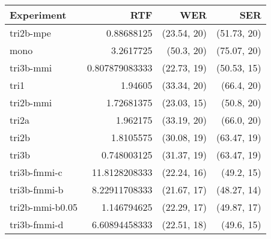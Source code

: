 \begin{table}[!htp]\label{tab:best_nooov}\centering\begin{tabular}{l|rrr}
Experiment      & \ac{RTF}       & \ac{WER}         & \ac{SER} \\
\hline
tri2b-mpe       & 0.88688125     & (23.54, 20) & (51.73, 20)\\
mono            & 3.2617725      & (50.3, 20)  & (75.07, 20)\\
tri3b-mmi       & 0.807879083333 & (22.73, 19) & (50.53, 15)\\
tri1            & 1.94605        & (33.34, 20) & (66.4, 20) \\
tri2b-mmi       & 1.72681375     & (23.03, 15) & (50.8, 20) \\
tri2a           & 1.962175       & (33.19, 20) & (66.0, 20) \\
tri2b           & 1.8105575      & (30.08, 19) & (63.47, 19)\\
tri3b           & 0.748003125    & (31.37, 19) & (63.47, 19)\\
tri3b-fmmi-c    & 11.8128208333  & (22.24, 16) & (49.2, 15) \\
tri3b-fmmi-b    & 8.22911708333  & (21.67, 17) & (48.27, 14)\\
tri2b-mmi-b0.05 & 1.146794625    & (22.29, 17) & (49.87, 17)\\
tri3b-fmmi-d    & 6.60894458333  & (22.51, 18) & (49.6, 15)
\end{tabular}
\caption{}
\end{table}  

